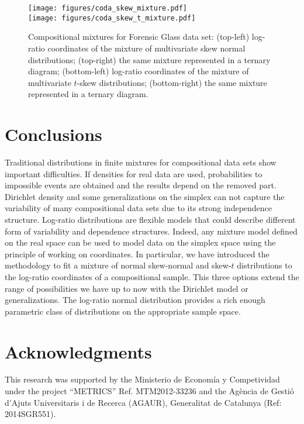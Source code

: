 \documentclass[12pt, a4paper]{article}
\begin{document}
\begin{figure}[htbp]
\centering
\texttt{[image: figures/coda\_skew\_mixture.pdf]}\\%
\texttt{[image: figures/coda\_skew\_t\_mixture.pdf]}%
\caption{Compositional mixtures for Forensic Glass data set: (top-left) log-ratio coordinates of the mixture of multivariate skew normal distributions; (top-right) the same mixture represented in a ternary diagram; (bottom-left) log-ratio coordinates of the mixture of multivariate $t$-skew distributions; (bottom-right) the same mixture represented in a ternary diagram.}
\label{othercodadist}
\end{figure}


\section{Conclusions}
\label{conclusion_section}
Traditional distributions in finite mixtures for compositional data sets show important difficulties. If densities for real data are used, probabilities to impossible events are obtained and the results depend on the removed part. Dirichlet density and some generalizations on the simplex can not capture the variability of many compositional data sets due to its strong independence structure. Log-ratio distributions are flexible models that could describe different form of variability and dependence structures. Indeed, any mixture model defined on the real space can be used to model data on the simplex space using the principle of working on coordinates. In particular, we have introduced the methodology to fit a mixture of normal skew-normal and skew-$t$ distributions to the log-ratio coordinates of a compositional sample. This three options extend the range of possibilities we have up to now with the Dirichlet model or generalizations. The log-ratio normal distribution provides a rich enough parametric class of distributions on the appropriate sample space. 

\section*{Acknowledgments}
This research was supported by the Ministerio de Econom\'ia y Competividad under the project
``METRICS'' Ref. MTM2012-33236 and the Agència de Gestió d'Ajuts Universitaris i de Recerca (AGAUR), Generalitat de Catalunya (Ref: 2014SGR551).

\end{document}
